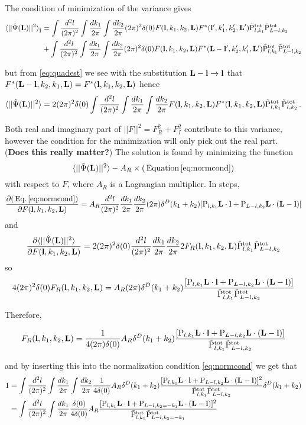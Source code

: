 \documentclass[12pt]{article}
\newcommand{\beq}{\begin{equation}}
\newcommand{\eeq}{\end{equation}}
\newcommand{\beqal}{\begin{aligned}}
\newcommand{\eeqal}{\end{aligned}}
\def\l{{\bf l}}
\def\L{{\bf L}}
\def\tot{{\rm tot}}
\def\il{{\tilde{\rm I}}}
\def\pul{{\rm P}}
\def\ptot{{\tilde{\rm P}^{\rm tot}}}
\def\d2l{\frac{d^2l}{(2\pi)^2}}
\def\dko{\frac{dk_1}{2\pi}}
\def\dkt{\frac{dk_2}{2\pi}}
\numberwithin{equation}{section}
\begin{document}
The condition of minimization of the variance gives 
\beq
\beqal
\langle ||\hat{\Psi}(\L)||^2\rangle_\il &= \int \d2l \int \dko \int \dkt (2\pi)^2 \delta(0) F(\l,k_1,k_2,\L)
F^*(\l',k_1',k_2',\L') \ptot_{l,k_1}\ptot_{L-l,k_2} \\
&  + \int \d2l \int \dko \int \dkt (2\pi)^2 \delta(0) F(\l,k_1,k_2,\L)
F^*(\L-\l',k_2',k_1',\L') \ptot_{l,k_1}\ptot_{L-l,k_2}
\eeqal
\eeq

but from \ref{eq:quadest} we see with the substitution $\L-\l
\rightarrow \l$ that $F^*(\L-\l,k_2,k_1,\L) = F^*(\l,k_1,k_2,\L)$
hence
\beq
\langle ||\hat{\Psi}(\L)||^2\rangle = 2 (2\pi)^2 \delta(0) \int \d2l \int \dko \int
\dkt F(\l,k_1,k_2,\L) F^*(\l,k_1,k_2,\L) \ptot_{l,k_1}\ptot_{l,k_2} \, .  \label{eq:phisqavg}
\eeq

Both real and imaginary part of $||F||^2=F_R^2+F_I^2$ contribute
to this variance, however the condition for the
minimization will only pick out the real part. (\textbf{Does this really matter?}) The solution is found
by minimizing the function
\beq
\langle ||\hat{\Psi}(\L)||^2\rangle- A_R \times (\, {\rm Equation} \, \ref{eq:normcond})
\eeq
with respect to $F$, where $A_R$ is a Lagrangian multiplier. In steps,
\beq
\frac{\partial (\, {\rm Eq.}\, \ref{eq:normcond})}{\partial F(\l,k_1,k_2,\L)} = A_R \d2l \dko \dkt
(2\pi) \delta^D(k_1+k_2) [\pul_{l,k_1} \L\cdot \l + \pul_{L-l,k_2} \L\cdot (\L-\l)]
\eeq
and
\beq
\frac{\partial \langle ||\hat{\Psi}(\L)||^2 \rangle}{\partial F(\l,k_1,k_2,\L)} =
2 (2\pi)^2 \delta(0) \d2l \dko \dkt 2 F_R(\l,k_1,k_2,\L)
\ptot_{l,k_1}\ptot_{L-l,k_2}
\eeq
so
\beq
\beqal
4 (2\pi)^2 \delta(0)  F_R(\l,k_1,k_2,\L) = A_R (2\pi) \delta^D(k_1+k_2) \frac{[\pul_{l,k_1} \L\cdot \l +
	\pul_{L-l,k_2} \L\cdot (\L-\l)]}{\ptot_{l,k_1}\ptot_{L-l,k_2}}
\label{eq:expforf}
\eeqal
\eeq

Therefore,

\beq
\beqal
F_R(\l,k_1,k_2,\L) = \frac{1}{4 (2\pi) \delta(0) } A_R \delta^D(k_1+k_2) \frac{[\pul_{l,k_1} \L\cdot \l +
	\pul_{L-l,k_2} \L\cdot (\L-\l)]}{\ptot_{l,k_1}\ptot_{L-l,k_2}}
\label{eq:expforf}
\eeqal
\eeq


and by inserting this into the normalization condition
\ref{eq:normcond} we get that
\beq
\beqal
1 &= \int \d2l \int \dko \int \dkt \frac{1}{4 \delta(0) } A_R \delta^D(k_1+k_2) \frac{[\pul_{l,k_1} \L\cdot \l +
	\pul_{L-l,k_2} \L\cdot (\L-\l)]^2}{\ptot_{l,k_1}\ptot_{L-l,k_2}} \delta^D(k_1+k_2) 
\\
& = \int \d2l \int \dko \frac{\delta(0)}{4 \delta(0) } A_R \frac{[\pul_{l,k_1} \L\cdot \l +
	\pul_{L-l,k_2 = -k_1} \L\cdot (\L-\l)]^2}{\ptot_{l,k_1}\ptot_{L-l,k_2 = -k_1}} 
\eeqal
\eeq
\end{document}
